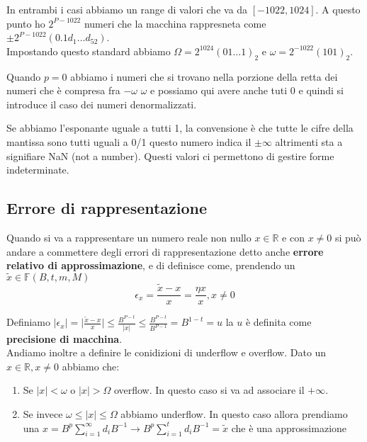 \hspace{-15pt}In entrambi i casi abbiamo un range di valori che va da \([-1022, 1024]\). A questo punto ho \(2^{P-1022}\) numeri che la 
macchina rappresneta come \(\pm 2^{P - 1022}(0.1d_1 \dots d_{52})\).\\
Impostando questo standard abbiamo \(\Omega = 2^{1024}(01 \dots 1)_2\) e \(\omega = 2^{-1022} (101)_2\).\\

\begin{observation}
    Quando \(p=0\) abbiamo i numeri che si trovano nella porzione della retta dei numeri che è compresa fra \(-\omega\) \(\omega\)
    e possiamo qui avere anche tuti 0 e quindi si introduce il caso dei numeri denormalizzati.
\end{observation}

\hspace{-15pt}Se abbiamo l'esponante uguale a tutti 1, la convensione è che tutte le cifre della mantissa sono tutti uguali a 0/1
questo numero indica il \(\pm \infty\) altrimenti sta a signifiare NaN (not a number). Questi valori ci permettono di gestire
forme indeterminate.

\subsection{Errore di rappresentazione}
Quando si va a rappresentare un numero reale non nullo \(x \in \mathbb{R}\) e con \(x \neq 0\) si può andare a commettere degli 
errori di rappresentazione detto anche \textbf{errore relativo di approssimazione}, e di definisce come, prendendo un \(\tilde{x} \in \mathbb{F}(B, t, m, M)\)
\[\epsilon_x = \frac{\tilde{x} - x}{x} = \frac{\eta x}{x}, x \neq 0\]

\hspace{-15pt}Definiamo \(|\epsilon_x| = \big | \frac{\tilde{x} - x}{x}\big | \leq \frac{B^{P-t}}{| x|} \leq \frac{B^{P - t}}{B^{P - 1}} = B^{1 - t} = u\)
la \(u\) è definita come \textbf{precisione di macchina}.\\

\hspace{-15pt}Andiamo inoltre a definire le conidizioni di underflow e overflow. Dato un \(x \in \mathbb{R}, x \neq 0\) abbiamo che:
\begin{enumerate}
    \item Se \(|x| < \omega\) o \(|x| > \Omega\) overflow. In questo caso si va ad associare il \(+\infty\).
    \item Se invece \(\omega \leq |x| \leq \Omega\) abbiamo underflow. In questo caso allora prendiamo una \(x = B^p \sum_{i = 1}^{\infty}d_i B^{-1}
    \longrightarrow B^p \sum_{i=1}^{t}d_i B^{-1} = \tilde{x}\) che è una approssimazione 
\end{enumerate}